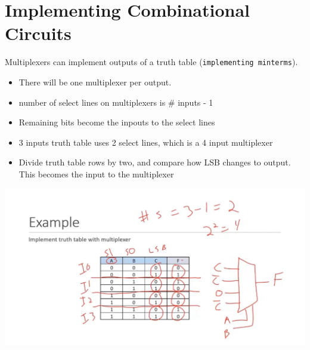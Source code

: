 \documentclass[a4paper,12pt]{article}
\begin{document}
                \section{Implementing Combinational Circuits}
                    Multiplexers can implement outputs of a truth table (\texttt{implementing minterms}).
                    \begin{itemize}
                        \item There will be one multiplexer per output.
                        \item number of select lines on multiplexers is \# inputs - 1
                        \item Remaining bits become the inpouts to the select lines
                        \item 3 inputs truth table uses 2 select lines, which is a 4 input multiplexer
                        \item Divide truth table rows by two, and compare how LSB changes to output. This becomes the input to the multiplexer
                    \end{itemize}
                    \includegraphics[width=14cm]{truthtomultEX1.jpeg}
\end{document}
